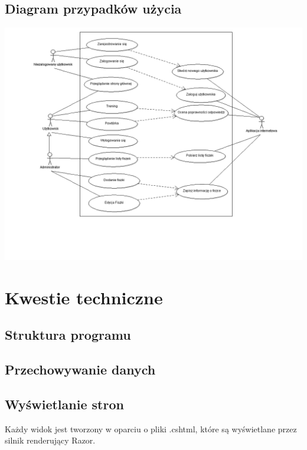 \section{Diagram przypadków użycia}

\begin{center}
	\includegraphics[width=\textwidth]{images/usecases.png}
\end{center}


\newpage
{\let\cleardoublepage\relax \chapter{Kwestie techniczne}}

\section{Struktura programu}



\section{Przechowywanie danych}

\section{Wyświetlanie stron}

Każdy widok jest tworzony w oparciu o pliki .cshtml, które są wyświetlane przez silnik renderujący Razor. 
